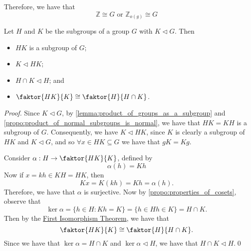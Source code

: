 \begin{eg}
  Therefore, we have that
  \begin{equation*}
    \mathbb{Z} \cong G \text{ or } \mathbb{Z}_{o(g)} \cong G
  \end{equation*}
\end{eg}

\begin{thm}
\label{thm:second_isomorphism_theorem}
  Let $H$ and $K$ be the subgroups of a group $G$ with $K \triangleleft G$. Then
  \begin{itemize}
    \item $HK$ is a subgroup of $G$;
    \item $K \triangleleft HK$;
    \item $H \cap K \triangleleft H$; and
    \item $\faktor{HK}{K} \cong \faktor{H}{H \cap K}$.
  \end{itemize}
\end{thm}

\begin{proof}
  Since $K \triangleleft G$, by \cref{lemma:product_of_groups_as_a_subgroup} and \cref{propo:product_of_normal_subgroups_is_normal}, we have that $HK = KH$ is a subgroup of $G$. Consequently, we have $K \triangleleft HK$, since $K$ is clearly a subgroup of $HK$ and $K \triangleleft G$, and so $\forall x \in HK \subseteq G$ we have that $gK = Kg$.

  Consider $\alpha : H \to \faktor{HK}{K}$, defined by
  \begin{equation*}
    \alpha(h) = Kh
  \end{equation*}
  Now if $x = kh \in KH = HK$, then
  \begin{equation*}
    Kx = K(kh) = Kh = \alpha(h).
  \end{equation*}
  Therefore, we have that $\alpha$ is surjective. Now by \cref{propo:properties_of_cosets}, observe that
  \begin{equation*}
    \ker \alpha = \{h \in H : Kh = K \} = \{h \in H h \in K \} = H \cap K.
  \end{equation*}
  Then by the \hyperref[thm:first_isomorphism_theorem]{First Isomorphism Theorem}, we have that
  \begin{equation*}
    \faktor{HK}{K} \cong \faktor{H}{H \cap K}.
  \end{equation*}
  Since we have that $\ker \alpha = H \cap K$ and $\ker \alpha \triangleleft H$, we have that $H \cap K \triangleleft H$.\qed
\end{proof}

